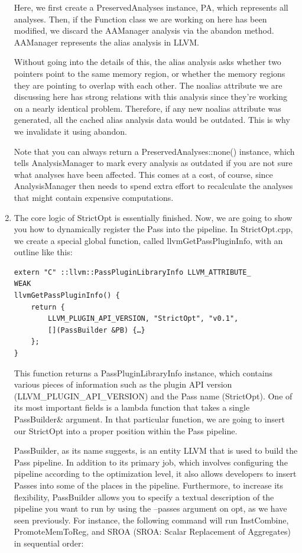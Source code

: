 \begin{enumerate}
Here, we first create a PreservedAnalyses instance, PA, which represents all analyses. Then, if the Function class we are working on here has been modified, we discard the AAManager analysis via the abandon method. AAManager represents the alias analysis in LLVM.

Without going into the details of this, the alias analysis asks whether two pointers point to the same memory region, or whether the memory regions they are pointing to overlap with each other. The noalias attribute we are discussing here has strong relations with this analysis since they're working on a nearly identical problem. Therefore, if any new noalias attribute was generated, all the cached alias analysis data would be outdated. This is why we invalidate it using abandon.

Note that you can always return a PreservedAnalyses::none() instance, which tells AnalysisManager to mark every analysis as outdated if you are not sure what analyses have been affected. This comes at a cost, of course, since AnalysisManager then needs to spend extra effort to recalculate the analyses that might contain expensive computations.

\item The core logic of StrictOpt is essentially finished. Now, we are going to show you how to dynamically register the Pass into the pipeline. In StrictOpt.cpp, we create a special global function, called llvmGetPassPluginInfo, with an outline like this:

\begin{lstlisting}[style=styleCXX]
extern "C" ::llvm::PassPluginLibraryInfo LLVM_ATTRIBUTE_
WEAK
llvmGetPassPluginInfo() {
	return {
		LLVM_PLUGIN_API_VERSION, "StrictOpt", "v0.1",
		[](PassBuilder &PB) {…}
	};
}
\end{lstlisting}
 
This function returns a PassPluginLibraryInfo instance, which contains various pieces of information such as the plugin API version (LLVM\_PLUGIN\_API\_VERSION) and the Pass name (StrictOpt). One of its most important fields is a lambda function that takes a single PassBuilder\& argument. In that particular function, we are going to insert our StrictOpt into a proper position within the Pass pipeline.

PassBuilder, as its name suggests, is an entity LLVM that is used to build the Pass pipeline. In addition to its primary job, which involves configuring the pipeline according to the optimization level, it also allows developers to insert Passes into some of the places in the pipeline. Furthermore, to increase its flexibility, PassBuilder allows you to specify a textual description of the pipeline you want to run by using the --passes argument on opt, as we have seen previously. For instance, the following command will run InstCombine, PromoteMemToReg, and SROA (SROA: Scalar Replacement of Aggregates) in sequential order:


\end{enumerate}
